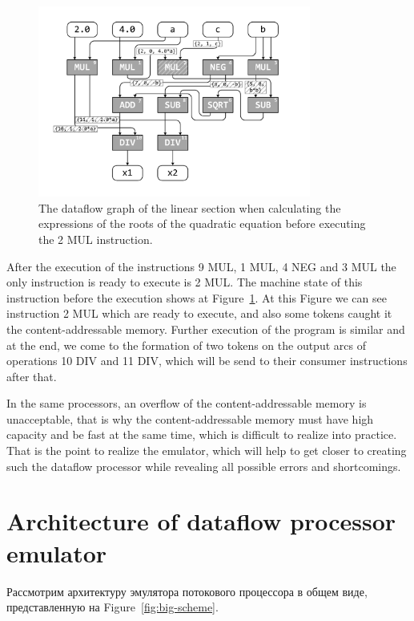 \documentclass[
11pt,%
tightenlines,%
twoside,%
onecolumn,%
nofloats,%
nobibnotes,%
nofootinbib,%
superscriptaddress,%
noshowpacs,%
centertags]%
{revtex4}
\begin{document}
\begin{figure}[h]
\setcaptionmargin{5mm}
\onelinecaptionsfalse %
\includegraphics[width=0.80\textwidth]{pics/dataflow2.pdf}
\caption{The dataflow graph of the linear section when calculating the expressions of the roots of the quadratic equation before executing the 2 MUL instruction.}\label{fig:dataflow2}
\end{figure}

After the execution of the instructions 9 MUL, 1 MUL, 4 NEG and 3 MUL the only instruction is ready to execute is 2 MUL.
The machine state of this instruction before the execution shows at Figure~\ref{fig:dataflow2}.
At this Figure we can see instruction 2 MUL which are ready to execute, and also some tokens caught it the content-addressable memory.
Further execution of the program is similar and at the end, we come to the formation of two tokens on the output arcs of operations 10 DIV and 11 DIV, which will be send to their consumer instructions after that.

In the same processors, an overflow of the content-addressable memory is unacceptable, that is why the content-addressable memory must have high capacity and be fast at the same time, which is difficult to realize into practice.
That is the point to realize the emulator, which will help to get closer to creating such the dataflow processor while revealing all possible errors and shortcomings.

\section{Architecture of dataflow processor emulator}

Рассмотрим архитектуру эмулятора потокового процессора в общем виде, представленную на Figure~\ref{fig:big-scheme}.
\end{document}
